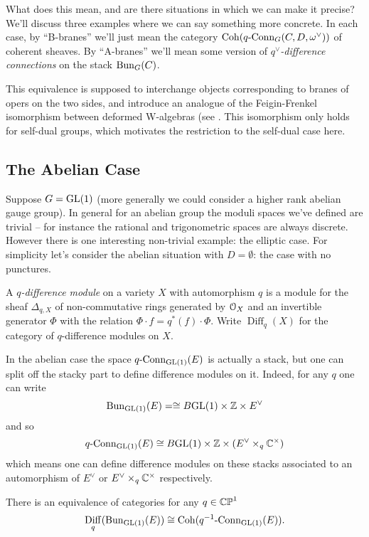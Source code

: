 \documentclass[10pt, oneside]{article}
\newcommand{\qconn}{q\text{-Conn}}
\renewcommand{\conn}{\text{-Conn}}
\DeclareMathOperator{\diff}{Diff}
\begin{document}
What does this mean, and are there situations in which we can make it precise?  We'll discuss three examples where we can say something more concrete.  In each case, by ``B-branes'' we'll just mean the category $\coh(\qconn_G(C, D, \omega^\vee))$ of coherent sheaves.  By ``A-branes'' we'll mean some version of \emph{$q^\vee$-difference connections} on the stack $\operatorname{Bun}_G(C)$.

\begin{remark}
This equivalence is supposed to interchange objects corresponding to branes of opers on the two sides, and introduce an analogue of the Feigin-Frenkel isomorphism between deformed W-algebras (see \cite{FrenkelReshetikhinSTS, STSSevostyanov}.  This isomorphism only holds for self-dual groups, which motivates the restriction to the self-dual case here.
\end{remark}

\subsection{The Abelian Case}
Suppose $G = \mathrm{GL}(1)$ (more generally we could consider a higher rank abelian gauge group).  In general for an abelian group the moduli spaces we've defined are trivial -- for instance the rational and trigonometric spaces are always discrete.  However there is one interesting non-trivial example: the elliptic case.  For simplicity let's consider the abelian situation with $D = \emptyset$: the case with no punctures.

\begin{definition}
A \emph{$q$-difference module} on a variety $X$ with automorphism $q$ is a module for the sheaf $\Delta_{q,X}$ of non-commutative rings generated by $\mathcal{O}_X$ and an invertible generator $\Phi$ with the relation $\Phi \cdot f = q^*(f) \cdot \Phi$.  Write $\diff_q(X)$ for the category of $q$-difference modules on $X$.
\end{definition}

In the abelian case the space $\qconn_{\GL(1)}(E)$ is actually a stack, but one can split off the stacky part to define difference modules on it.  Indeed, for any $q$ one can write
\[\operatorname{Bun}_{\mathrm{GL}(1)}(E) = \cong B\mathrm{GL}(1) \times \mathbb{Z} \times E^\vee\]
and so
\[\qconn_{\GL(1)}(E) \iso B\GL(1) \times \ZZ \times (E^\vee \times_q \CC^\times)\]
which means one can define difference modules on these stacks associated to an automorphism of $E^\vee$ or $E^\vee \times_q \mathbb{C}^\times$ respectively.

\begin{conjecture}
There is an equivalence of categories for any $q \in \mathbb{CP}^1$
\[\diff_q(\bun_{\GL(1)}(E)) \iso \coh(q^{-1}\conn_{\GL(1)}(E)).\]
\end{conjecture}
\end{document}
